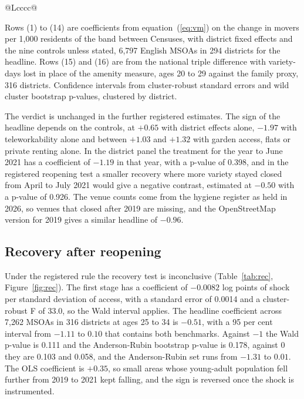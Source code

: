 \documentclass[11pt,a4paper]{article}
\newcommand{\tabnote}[1]{\par\smallskip\parbox{\linewidth}{\footnotesize #1}}
\begin{document}
\begin{table}[htbp]
\begin{tabularx}{\linewidth}{@{}Lcccc@{}}
\bottomrule
\end{tabularx}
\tabnote{Rows (1) to (14) are coefficients from equation~(\ref{eq:vm}) on the change in movers per 1,000 residents of the band between Censuses, with district fixed effects and the nine controls unless stated, 6,797 English MSOAs in 294 districts for the headline. Rows (15) and (16) are from the national triple difference with variety-days lost in place of the amenity measure, ages 20 to 29 against the family proxy, 316 districts. Confidence intervals from cluster-robust standard errors and wild cluster bootstrap p-values, clustered by district.}
\end{table}

The verdict is unchanged in the further registered estimates. The sign of the headline depends on the controls, at $+0.65$ with district effects alone, $-1.97$ with teleworkability alone and between $+1.03$ and $+1.32$ with garden access, flats or private renting alone. In the district panel the treatment for the year to June 2021 has a coefficient of $-1.19$ in that year, with a p-value of 0.398, and in the registered reopening test a smaller recovery where more variety stayed closed from April to July 2021 would give a negative contrast, estimated at $-0.50$ with a p-value of 0.926. The venue counts come from the hygiene register as held in 2026, so venues that closed after 2019 are missing, and the OpenStreetMap version for 2019 gives a similar headline of $-0.96$.

\subsection{Recovery after reopening}\label{sec:recovery}

Under the registered rule the recovery test is inconclusive (Table~\ref{tab:rec}, Figure~\ref{fig:rec}). The first stage has a coefficient of $-0.0082$ log points of shock per standard deviation of access, with a standard error of 0.0014 and a cluster-robust F of 33.0, so the Wald interval applies. The headline coefficient across 7,262 MSOAs in 316 districts at ages 25 to 34 is $-0.51$, with a 95 per cent interval from $-1.11$ to $0.10$ that contains both benchmarks. Against $-1$ the Wald p-value is 0.111 and the Anderson-Rubin bootstrap p-value is 0.178, against 0 they are 0.103 and 0.058, and the Anderson-Rubin set runs from $-1.31$ to $0.01$. The OLS coefficient is $+0.35$, so small areas whose young-adult population fell further from 2019 to 2021 kept falling, and the sign is reversed once the shock is instrumented.
\end{document}
